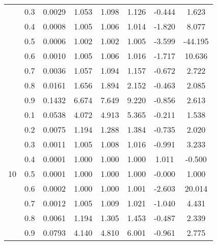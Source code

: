 \documentclass[11pt,a4paper]{report}
\begin{document}
\begin{longtable}{ | c | c || c | c | c | c | c | c | }
 & 0.3 & 0.0029 & 1.053 & 1.098 & 1.126 & -0.444 & 1.623 \\
 & 0.4 & 0.0008 & 1.005 & 1.006 & 1.014 & -1.820 & 8.077 \\
 & 0.5 & 0.0006 & 1.002 & 1.002 & 1.005 & -3.599 & -44.195 \\
 & 0.6 & 0.0010 & 1.005 & 1.006 & 1.016 & -1.717 & 10.636 \\
 & 0.7 & 0.0036 & 1.057 & 1.094 & 1.157 & -0.672 & 2.722 \\
 & 0.8 & 0.0161 & 1.656 & 1.894 & 2.152 & -0.463 & 2.085 \\
 & 0.9 & 0.1432 & 6.674 & 7.649 & 9.220 & -0.856 & 2.613 \\
 \hline
\multirow{9}{*}{10} & 0.1 & 0.0538 & 4.072 & 4.913 & 5.365 & -0.211 & 1.538 \\
 & 0.2 & 0.0075 & 1.194 & 1.288 & 1.384 & -0.735 & 2.020 \\
 & 0.3 & 0.0011 & 1.005 & 1.008 & 1.016 & -0.991 & 3.233 \\
 & 0.4 & 0.0001 & 1.000 & 1.000 & 1.000 & 1.011 & -0.500 \\
 & 0.5 & 0.0001 & 1.000 & 1.000 & 1.000 & -0.000 & 1.000 \\
 & 0.6 & 0.0002 & 1.000 & 1.000 & 1.001 & -2.603 & 20.014 \\
 & 0.7 & 0.0012 & 1.005 & 1.009 & 1.021 & -1.040 & 4.431 \\
 & 0.8 & 0.0061 & 1.194 & 1.305 & 1.453 & -0.487 & 2.339 \\
 & 0.9 & 0.0793 & 4.140 & 4.810 & 6.001 & -0.961 & 2.775 \\
 \hline
\hline
\end{longtable}
\end{document}

